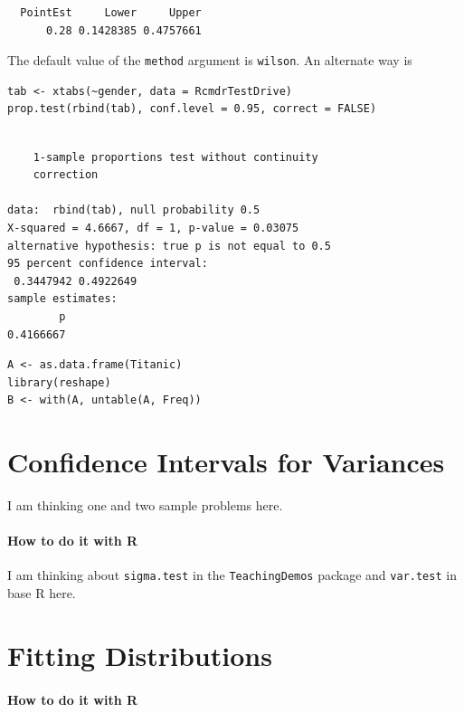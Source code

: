 \documentclass[captions=tableheading]{scrbook}
\begin{document}
\begin{verbatim}
  PointEst     Lower     Upper
      0.28 0.1428385 0.4757661
\end{verbatim}

The default value of the \texttt{method} argument is \texttt{wilson}.  An alternate way is 



\begin{verbatim}
tab <- xtabs(~gender, data = RcmdrTestDrive)
prop.test(rbind(tab), conf.level = 0.95, correct = FALSE)
\end{verbatim}


\begin{verbatim}
 
	1-sample proportions test without continuity
	correction

data:  rbind(tab), null probability 0.5 
X-squared = 4.6667, df = 1, p-value = 0.03075
alternative hypothesis: true p is not equal to 0.5 
95 percent confidence interval:
 0.3447942 0.4922649 
sample estimates:
        p 
0.4166667
\end{verbatim}


\begin{verbatim}
A <- as.data.frame(Titanic)
library(reshape)
B <- with(A, untable(A, Freq))
\end{verbatim}
\section{Confidence Intervals for Variances}
\label{sec-9-5}

\label{sec:Confidence-Intervals-for-Variances}

I am thinking one and two sample problems here.

\paragraph*{How to do it with \textsf{R}}

I am thinking about \texttt{sigma.test} in the \texttt{TeachingDemos} package and \texttt{var.test} in base \textsf{R} here.
\section{Fitting Distributions}
\label{sec-9-6}

\label{sec:Fitting-Distributions}


\paragraph*{How to do it with \textsf{R}}
\end{document}
